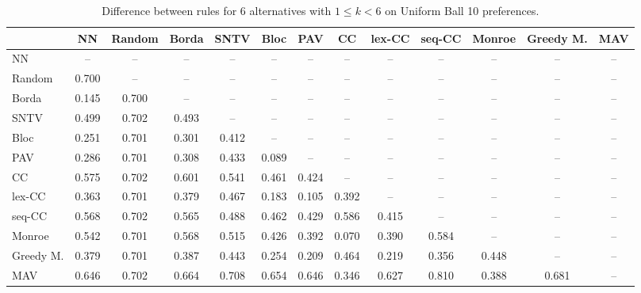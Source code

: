 
\begin{table*}[h!]
\centering
\begin{tabular}{lcccccccccccc}
\toprule
 & NN & Random & Borda & SNTV & Bloc & PAV & CC & lex-CC & seq-CC & Monroe & Greedy M. & MAV \\
\midrule
NN & -- & -- & -- & -- & -- & -- & -- & -- & -- & -- & -- & -- \\
Random & 0.700 & -- & -- & -- & -- & -- & -- & -- & -- & -- & -- & -- \\
Borda & 0.145 & 0.700 & -- & -- & -- & -- & -- & -- & -- & -- & -- & -- \\
SNTV & 0.499 & 0.702 & 0.493 & -- & -- & -- & -- & -- & -- & -- & -- & -- \\
Bloc & 0.251 & 0.701 & 0.301 & 0.412 & -- & -- & -- & -- & -- & -- & -- & -- \\
PAV & 0.286 & 0.701 & 0.308 & 0.433 & 0.089 & -- & -- & -- & -- & -- & -- & -- \\
CC & 0.575 & 0.702 & 0.601 & 0.541 & 0.461 & 0.424 & -- & -- & -- & -- & -- & -- \\
lex-CC & 0.363 & 0.701 & 0.379 & 0.467 & 0.183 & 0.105 & 0.392 & -- & -- & -- & -- & -- \\
seq-CC & 0.568 & 0.702 & 0.565 & 0.488 & 0.462 & 0.429 & 0.586 & 0.415 & -- & -- & -- & -- \\
Monroe & 0.542 & 0.701 & 0.568 & 0.515 & 0.426 & 0.392 & 0.070 & 0.390 & 0.584 & -- & -- & -- \\
Greedy M. & 0.379 & 0.701 & 0.387 & 0.443 & 0.254 & 0.209 & 0.464 & 0.219 & 0.356 & 0.448 & -- & -- \\
MAV & 0.646 & 0.702 & 0.664 & 0.708 & 0.654 & 0.646 & 0.346 & 0.627 & 0.810 & 0.388 & 0.681 & -- \\
\bottomrule
\end{tabular}

\caption{Difference between rules for 6 alternatives with $1 \leq k < 6$ on Uniform Ball 10 preferences.}
\end{table*}
